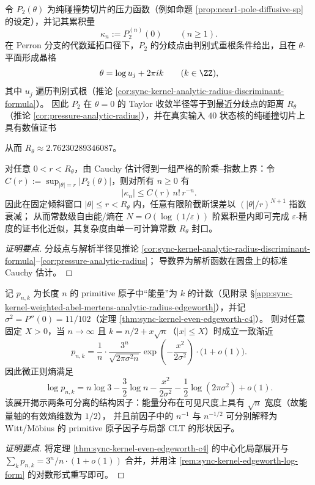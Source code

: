 \begin{conclusion}\label{con:xi-terminal-pressure-analytic-radius-cumulant-bound}
令 \(P_2(\theta)\) 为纯碰撞势切片的压力函数（例如命题 \ref{prop:near1-pole-diffusive-sp} 的设定），并记其累积量
\[
\kappa_n:=P_2^{(n)}(0)\qquad(n\ge 1).
\]
在 Perron 分支的代数延拓口径下，\(P_2\) 的分歧点由判别式重根条件给出，且在 \(\theta\)-平面形成晶格
\[
\theta=\log u_j+2\pi i k\qquad(k\in\ZZ),
\]
其中 \(u_j\) 遍历判别式根（推论 \ref{cor:sync-kernel-analytic-radius-discriminant-formula}）。
因此 \(P_2\) 在 \(\theta=0\) 的 Taylor 收敛半径等于到最近分歧点的距离 \(R_\theta\)（推论 \ref{cor:pressure-analytic-radius}），并在真实输入 \(40\) 状态核的纯碰撞切片上具有数值证书

从而 \(R_\theta\approx 2.76230289346087\)。
\par
对任意 \(0<r<R_\theta\)，由 Cauchy 估计得到一组严格的阶乘--指数上界：令
\(
C(r):=\sup_{|\theta|=r}|P_2(\theta)|
\)，则对所有 \(n\ge 0\) 有
\[
\boxed{\;
|\kappa_n|\le C(r)\,n!\,r^{-n}.\;}
\]
因此在固定倾斜窗口 \(|\theta|\le r<R_\theta\) 内，任意有限阶截断误差以 \((|\theta|/r)^{N+1}\) 指数衰减；
从而常数级自由能/熵在 \(N=O(\log(1/\varepsilon))\) 阶累积量内即可完成 \(\varepsilon\)-精度的证书化近似，其复杂度由单一可计算常数 \(R_\theta\) 封口。
\end{conclusion}
\begin{proof}[证明要点]
分歧点与解析半径见推论 \ref{cor:sync-kernel-analytic-radius-discriminant-formula}--\ref{cor:pressure-analytic-radius}；
导数界为解析函数在圆盘上的标准 Cauchy 估计。
\end{proof}

\begin{conclusion}\label{con:xi-terminal-primitive-microcanonical-dim-half}
记 \(p_{n,k}\) 为长度 \(n\) 的 primitive 原子中“能量”为 \(k\) 的计数（见附录 \S\ref{app:sync-kernel-weighted-abel-mertens-analytic-radius-edgeworth}），并记
\(\sigma^2=P''(0)=11/102\)（定理 \ref{thm:sync-kernel-even-edgeworth-c4}）。
则对任意固定 \(X>0\)，当 \(n\to\infty\) 且 \(k=n/2+x\sqrt n\)（\(|x|\le X\)）时成立一致渐近
\[
p_{n,k}
=\frac{1}{n}\cdot\frac{3^n}{\sqrt{2\pi\sigma^2 n}}
\exp\!\left(-\frac{x^2}{2\sigma^2}\right)\cdot\bigl(1+o(1)\bigr).
\]
因此微正则熵满足
\[
\log p_{n,k}
=n\log3-\frac{3}{2}\log n-\frac{x^2}{2\sigma^2}-\frac{1}{2}\log(2\pi\sigma^2)+o(1).
\]
该展开揭示两条可分离的结构因子：能量分布在可见尺度上具有 \(\sqrt n\) 宽度（故能量轴的有效熵维数为 \(1/2\)），
并且前因子中的 \(n^{-1}\) 与 \(n^{-1/2}\) 可分别解释为 Witt/Möbius 的 primitive 原子因子与局部 CLT 的形状因子。
\end{conclusion}
\begin{proof}[证明要点]
将定理 \ref{thm:sync-kernel-even-edgeworth-c4} 的中心化局部展开与
\(\sum_k p_{n,k}=3^n/n\cdot(1+o(1))\)
合并，并用注 \ref{rem:sync-kernel-edgeworth-log-form} 的对数形式重写即可。
\end{proof}

